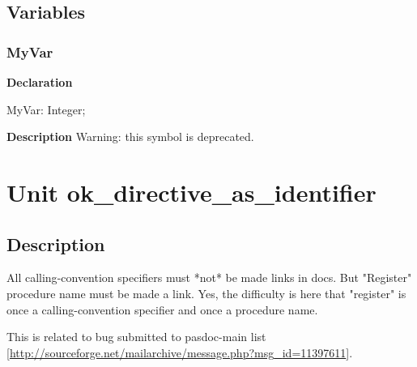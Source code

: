 \documentclass{report}
\newif\ifpdf
\begin{document}
\section{Variables}
\ifpdf
\subsection*{\large{\textbf{MyVar}}\normalsize\hspace{1ex}\hrulefill}
\else
\subsection*{MyVar}
\fi
\label{ok_deprecated_tag-MyVar}
\begin{list}{}{
\setlength{\itemindent}{0cm}
\setlength{\listparindent}{0cm}
\setlength{\leftmargin}{\evensidemargin}
\addtolength{\leftmargin}{\tmplength}
\settowidth{\labelsep}{X}
\addtolength{\leftmargin}{\labelsep}
\setlength{\labelwidth}{\tmplength}
}
\item[\textbf{Declaration}\hfill]
\ifpdf
\begin{flushleft}
\fi
\begin{ttfamily}
MyVar: Integer;\end{ttfamily}

\ifpdf
\end{flushleft}
\fi

\par
\item[\textbf{Description}]
Warning: this symbol is deprecated.

 

\end{list}
\chapter{Unit ok{\_}directive{\_}as{\_}identifier}
\label{ok_directive_as_identifier}
\section{Description}
All calling{-}convention specifiers must *not* be made links in docs. But "Register" procedure name must be made a link. Yes, the difficulty is here that "register" is once a calling{-}convention specifier and once a procedure name.

This is related to bug submitted to pasdoc{-}main list [\href{http://sourceforge.net/mailarchive/message.php?msg_id=11397611}{http://sourceforge.net/mailarchive/message.php?msg{\_}id=11397611}].
\end{document}
